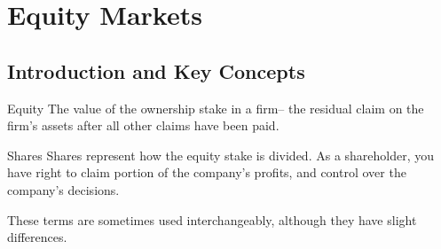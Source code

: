 \chapter{Equity Markets}
\renewcommand{\thesection}{3.1 - 3.2}
\section{Introduction and Key Concepts}
\setcounter{section}{2}
\renewcommand{\thesection}{\arabic{chapter}.\arabic{section}}

\begin{definitionbox}{Equity}
    The value of the ownership stake in a firm– the residual claim on the firm's assets after all other claims have been paid.
\end{definitionbox}

\begin{definitionbox}{Shares}
    Shares represent how the equity stake is divided. As a shareholder, you have right to claim portion of the company's profits, and control over the company's decisions.
\end{definitionbox}

These terms are sometimes used interchangeably, although they have slight differences.

